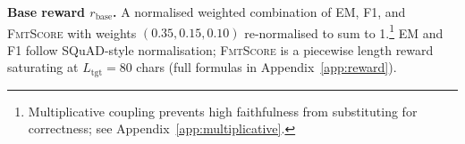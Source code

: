 \documentclass[11pt]{article}
\begin{document}

\textbf{Base reward $r_{\text{base}}$.}
A normalised weighted combination of EM, F1, and 
\textsc{FmtScore} with weights $(0.35, 0.15, 0.10)$ 
re-normalised to sum to 1.\footnote{Multiplicative 
coupling prevents high faithfulness from substituting 
for correctness; see Appendix~\ref{app:multiplicative}.} 
\textsc{EM} and \textsc{F1} follow SQuAD-style 
normalisation; \textsc{FmtScore} is a piecewise 
length reward saturating at $L_{\text{tgt}}\!=\!80$ 
chars (full formulas in Appendix~\ref{app:reward}).
\end{document}
